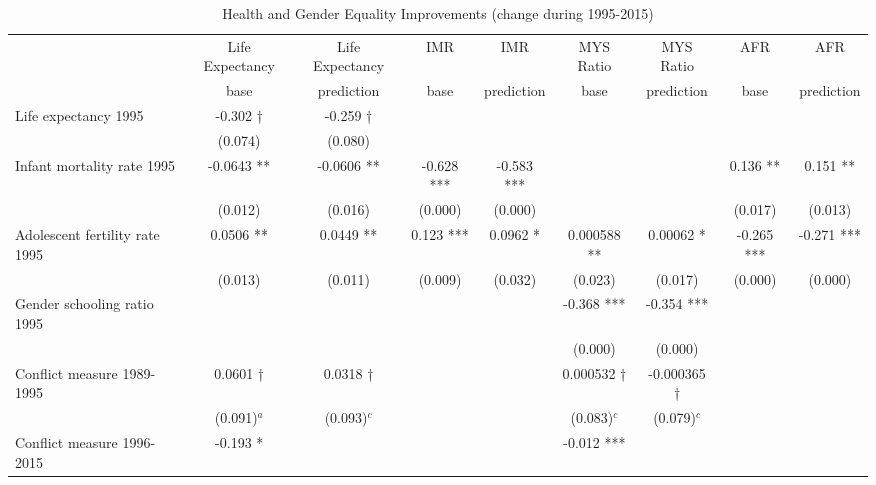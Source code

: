 \begin{landscape}
\begin{table}[!htbp]
\footnotesize
\centering
\caption{Health and Gender Equality Improvements (change during 1995-2015)}
\label{table_cs_hg}
\begin{tabular}{lcccccccc}
\toprule
                               & Life Expectancy & Life Expectancy & IMR         & IMR        & MYS Ratio       & MYS Ratio   & AFR        & AFR\\
                               & base            & prediction      & base        & prediction & base            & prediction  & base       & prediction \\
\midrule
Life expectancy 1995           & -0.302 †        & -0.259 †        &             &            &                 &             &            & \\
                               & (0.074)         & (0.080)         &             &            &                 &             &            & \\
Infant mortality rate 1995     & -0.0643 **      & -0.0606 **      & -0.628 ***  & -0.583 *** &                 &             & 0.136 **   & 0.151 **\\
                               & (0.012)         & (0.016)         & (0.000)     & (0.000)    &                 &             & (0.017)    & (0.013) \\
Adolescent fertility rate 1995 & 0.0506 **       & 0.0449 **       & 0.123 ***   & 0.0962 *   & 0.000588 **     & 0.00062 *   & -0.265 *** & -0.271 ***\\
                               & (0.013)         & (0.011)         & (0.009)     & (0.032)    & (0.023)         & (0.017)     & (0.000)    & (0.000) \\
Gender schooling ratio 1995    &                 &                 &             &            & -0.368 ***      & -0.354 ***  &            & \\
                               &                 &                 &             &            & (0.000)         & (0.000)     &            & \\
Conflict measure 1989-1995     & 0.0601 †        & 0.0318 †        &             &            & 0.000532 †      & -0.000365 † &            & \\
                               & (0.091)$^a$     & (0.093)$^c$     &             &            & (0.083)$^c$     & (0.079)$^c$ &            & \\
Conflict measure 1996-2015     & -0.193 *        &                 &             &            & -0.012 ***      &             &            & \\

\end{tabular}
\end{table}
\end{landscape}

